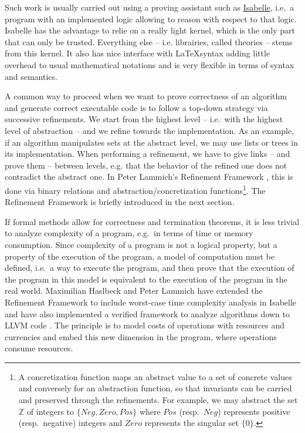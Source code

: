 \documentclass[12pt, a4 paper]{article}
\theoremstyle{definition}
\begin{document}
Such work is usually carried out using a proving assistant such as \href{https://isabelle.in.tum.de}{Isabelle}, i.e.\ a program with an implemented logic allowing to reason with respect to that logic.
Isabelle has the advantage to relie on a really light kernel, which is the only part that can only be trusted. Everything else -- i.e. librairies, called theories -- stems from this kernel.
It also has nice interface with \LaTeX syntax adding little overhead to usual mathematical notations and is very flexible in terms of syntax and semantics.

A common way to proceed when we want to prove correctness of an algorithm and generate correct executable code is to follow a top-down strategy via successive refinements.
We start from the highest level -- i.e.\ with the highest level of abstraction -- and we refine towards the implementation.
As an example, if an algorithm manipulates sets at the abstract level, we may use lists or trees in its implementation.
When performing a refinement, we have to give links -- and prove them -- between levels, e.g. that the behavior of the refined one does not contradict the abstract one.
In Peter Lammich's Refinement Framework \cite{lammich:ref}, this is done via binary relations and abstraction/concretization functions\footnote{A concretization function maps an abstract value to a set of concrete values and conversely for an abstraction function, so that invariants can be carried and preserved through the refinements.
For example, we may abstract the set $\mathbb{Z}$ of integers to $\{Neg, Zero, Pos\}$ where $Pos$ (resp.\ $Neg$) represents positive (resp.\ negative) integers and $Zero$ represents the singular set $\{0\}$.}. The Refinement Framework is briefly introduced in the next section.

\bigskip

If formal methods allow for correctness and termination theorems, it is less trivial to analyze complexity of a program, e.g.\ in terms of time or memory consumption.
Since complexity of a program is not a logical property, but a property of the execution of the program, a model of computation must be defined, i.e.\ a way to execute the program, and then prove that the execution of the program in this model is equivalent to the execution of the program in the real world.
Maximilian Haslbeck and Peter Lammich have extended the Refinement Framework to include worst-case time complexity analysis in Isabelle \cite{refwithtime} and have also implemented a verified framework to analyze algorithms down to LLVM code \cite{fewdollarsmore}.
The principle is to model costs of operations with resources and currencies and embed this new dimension in the program, where operations consume resources.
\end{document}
